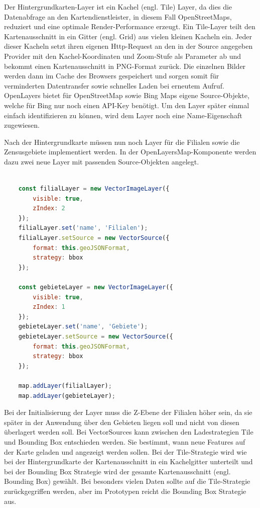 Der Hintergrundkarten-Layer ist ein Kachel (engl. Tile) Layer, da dies die Datenabfrage an den Kartendienstleister, in diesem Fall OpenStreetMaps, reduziert und eine optimale Render-Performance erzeugt.
Ein Tile-Layer teilt den Kartenausschnitt in ein Gitter (engl. Grid) aus vielen kleinen Kacheln ein.
Jeder dieser Kacheln setzt ihren eigenen Http-Request an den in der Source angegeben Provider mit den Kachel-Koordinaten und Zoom-Stufe als Parameter ab und bekommt einen Kartenausschnitt in PNG-Format zurück.
Die einzelnen Bilder werden dann im Cache des Browsers gespeichert und sorgen somit für verminderten Datentransfer sowie schnelles Laden bei erneutem Aufruf.
OpenLayers bietet für OpenStreetMap sowie Bing Maps eigene Source-Objekte, welche für Bing nur noch einen API-Key benötigt.
Um den Layer später einmal einfach identifizieren zu können, wird dem Layer noch eine Name-Eigenschaft zugewiesen.

Nach der Hintergrundkarte müssen nun noch Layer für die Filialen sowie die Zensusgebiete implementiert werden.
In der OpenLayersMap-Komponente werden dazu zwei neue Layer mit passenden Source-Objekten angelegt.

\begin{lstlisting}[language=JavaScript, caption={Erstellung der Filial- und Gebietelayer}]

	const filialLayer = new VectorImageLayer({
		visible: true,
		zIndex: 2
	});	
	filialLayer.set('name', 'Filialen');
	filialLayer.setSource = new VectorSource({
		format: this.geoJSONFormat,
		strategy: bbox	
	});

	const gebieteLayer = new VectorImageLayer({
		visible: true,
		zIndex: 1
	});
	gebieteLayer.set('name', 'Gebiete');
	gebieteLayer.setSource = new VectorSource({
		format: this.geoJSONFormat,
		strategy: bbox	
	});

	map.addLayer(filialLayer);
	map.addLayer(gebieteLayer);
\end{lstlisting}

Bei der Initialisierung der Layer muss die Z-Ebene der Filialen höher sein, da sie später in der Anwendung über den Gebieten liegen soll und nicht von diesen überlagert werden soll.
Bei VectorSources kann zwischen den Ladestrategien Tile und Bounding Box entschieden werden.
Sie bestimmt, wann neue Features auf der Karte geladen und angezeigt werden sollen.
Bei der Tile-Strategie wird wie bei der Hintergrundkarte der Kartenausschnitt in ein Kachelgitter unterteilt und bei der Bounding Box Strategie wird der gesamte Kartenausschnitt (engl. Bounding Box) gewählt. 
Bei besonders vielen Daten sollte auf die Tile-Strategie zurückgegriffen werden, aber im Prototypen reicht die Bounding Box Strategie aus.

